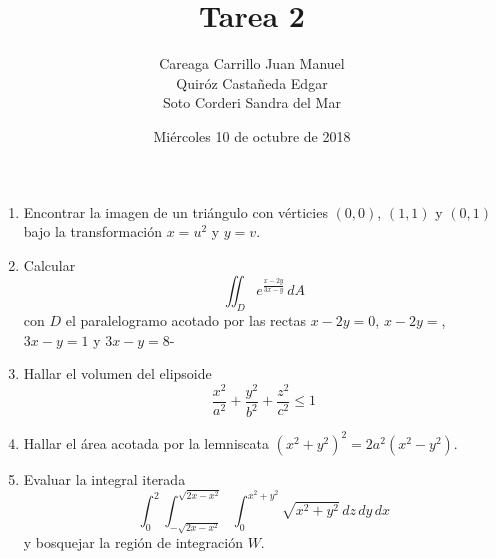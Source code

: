 \documentclass{article}
\begin{document}
    \title{Tarea 2}
    \author{Careaga Carrillo Juan Manuel\\
            Quiróz Castañeda Edgar\\
            Soto Corderi Sandra del Mar}
    \date{Miércoles 10 de octubre de 2018}
    \maketitle
    \begin{enumerate}
        \item {
            Encontrar la imagen de un triángulo con vérticies $(0,0)$, $(1,1)$
            y $(0,1)$ bajo la transformación $x=u^2$ y $y=v$.

            \color{azul}
        }

        \item {
            Calcular
            \[
                \iint_{D}{e^{\frac{x-2y}{3x-y}}\,dA}
            \]
            con $D$ el paralelogramo acotado por las rectas $x-2y=0$, $x-2y=$,
            $3x-y=1$ y $3x-y=8$-

            \color{azul}
        }

        \item {
            Hallar el volumen del elipsoide
            \[
                \frac{x^2}{a^2}+\frac{y^2}{b^2}+\frac{z^2}{c^2}\leq 1
            \]

            \color{azul}
        }

        \item {
            Hallar el área acotada por la lemniscata
            \(
                \left(x^2+y^2\right)^2=2a^2\left(x^2-y^2\right)
            \).

            \color{azul}
        }

        \item {
            Evaluar la integral iterada
            \[
                \int_{0}^{2}{
                    \int_{-\sqrt{2x-x^2}}^{\sqrt{2x-x^2}}{
                        \int_{0}^{x^2+y^2}{
                            \sqrt{x^2+y^2}
                        \,dz}
                    \,dy}
                \,dx}
            \]
            y bosquejar la región de integración $W$.

            \color{azul}
        }


\end{enumerate}
\end{document}
